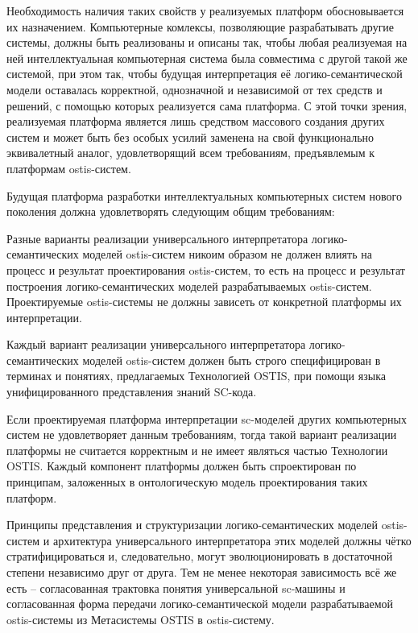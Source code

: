 Необходимость наличия таких свойств у реализуемых платформ обосновывается их назначением. Компьютерные комлексы,
позволяющие разрабатывать другие системы, должны быть реализованы и описаны так, чтобы любая реализуемая на ней
интеллектуальная компьютерная система была совместима с другой такой же системой, при этом так, чтобы будущая
интерпретация её логико-семантической модели оставалась корректной, однозначной и независимой от тех средств и
решений, с помощью которых реализуется сама платформа. С этой точки зрения, реализуемая платформа является лишь средством
массового создания других систем и может быть без особых усилий заменена на свой функционально эквивалетный аналог,
удовлетворящий всем требованиям, предъявлемым к платформам ostis-систем.

Будущая платформа разработки интеллектуальных компьютерных систем нового поколения должна удовлетворять следующим
общим требованиям:
\begin{scnitemize}
    \item Разные варианты реализации универсального интерпретатора логико-семантических моделей ostis-систем никоим
    образом не должен влиять на процесс и результат проектирования ostis-систем, то есть на процесс и результат
    построения логико-семантических моделей разрабатываемых ostis-систем. Проектируемые ostis-системы не должны зависеть
    от конкретной платформы их интерпретации.
    \item Каждый вариант реализации универсального интерпретатора логико-семантических моделей ostis-систем должен быть
    строго специфицирован в терминах и понятиях, предлагаемых Технологией OSTIS, при помощи языка унифицированного
    представления знаний SC-кода.
\end{scnitemize}

Если проектируемая платформа интерпретации sc-моделей других компьютерных систем не удовлетворяет данным требованиям,
тогда такой вариант реализации платформы не считается корректным и не имеет являться частью Технологии OSTIS. Каждый
компонент платформы должен быть спроектирован по принципам, заложенных в онтологическую модель проектирования таких
платформ.

Принципы представления и структуризации логико-семантических моделей ostis-систем и архитектура универсального
интерпретатора этих моделей должны чётко стратифицироваться и, следовательно, могут эволюционировать в достаточной
степени независимо друг от друга. Тем не менее некоторая зависимость всё же есть – согласованная трактовка понятия
универсальной sc-машины и согласованная форма передачи логико-семантической модели разрабатываемой ostis-системы из
Метасистемы OSTIS в  ostis-систему.

